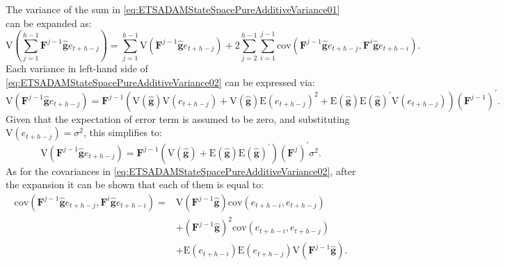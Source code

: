 \documentclass[
]{book}
\theoremstyle{definition}
\theoremstyle{definition}
\theoremstyle{definition}
\theoremstyle{definition}
\theoremstyle{remark}
\begin{document}
The variance of the sum in \eqref{eq:ETSADAMStateSpacePureAdditiveVariance01} can be expanded as:
\begin{equation}
    \mathrm{V} \left(\sum_{j=1}^{h-1} \mathbf{F}^{j-1} \hat{\mathbf{g}} e_{t+h-j} \right) = \sum_{j=1}^{h-1} \mathrm{V} \left(\mathbf{F}^{j-1} \hat{\mathbf{g}} e_{t+h-j}\right) + 2 \sum_{j=2}^{h-1} \sum_{i=1}^{j-1} \mathrm{cov}(\mathbf{F}^{j-1} \hat{\mathbf{g}} e_{t+h-j},\mathbf{F}^{i} \hat{\mathbf{g}} e_{t+h-i}).
  \label{eq:ETSADAMStateSpacePureAdditiveVariance02}
\end{equation}
Each variance in left-hand side of \eqref{eq:ETSADAMStateSpacePureAdditiveVariance02} can be expressed via:
\begin{equation}
    \mathrm{V} \left(\mathbf{F}^{j-1} \hat{\mathbf{g}} e_{t+h-j}\right) = \mathbf{F}^{j-1} \left( \mathrm{V} (\hat{\mathbf{g}}) \mathrm{V}(e_{t+h-j}) + \mathrm{V} (\hat{\mathbf{g}}) \mathrm{E}(e_{t+h-j})^2 + \mathrm{E} (\hat{\mathbf{g}}) \mathrm{E} (\hat{\mathbf{g}})^\prime \mathrm{V}(e_{t+h-j})\right) (\mathbf{F}^{j-1})^\prime.
  \label{eq:ETSADAMStateSpacePureAdditiveVariance03}
\end{equation}
Given that the expectation of error term is assumed to be zero, and substituting \(\mathrm{V}(e_{t+h-j})=\sigma^2\), this simplifies to:
\begin{equation}
    \mathrm{V} \left(\mathbf{F}^{j-1} \hat{\mathbf{g}} e_{t+h-j}\right) = \mathbf{F}^{j-1} \left( \mathrm{V} (\hat{\mathbf{g}}) + \mathrm{E} (\hat{\mathbf{g}}) \mathrm{E} (\hat{\mathbf{g}})^\prime \right) (\mathbf{F}^{j})^\prime \sigma^2.
  \label{eq:ETSADAMStateSpacePureAdditiveVariance04}
\end{equation}
As for the covariances in \eqref{eq:ETSADAMStateSpacePureAdditiveVariance02}, after the expansion it can be shown that each of them is equal to:
\begin{equation}
    \begin{aligned}
    \mathrm{cov}(\mathbf{F}^{j-1} \hat{\mathbf{g}} e_{t+h-j},\mathbf{F}^{i} \hat{\mathbf{g}} e_{t+h-i}) = & \mathrm{V}(\mathbf{F}^{j-1} \hat{\mathbf{g}}) \mathrm{cov}(e_{t+h-i},e_{t+h-j}) \\
     & + \left(\mathbf{F}^{j-1} \hat{\mathbf{g}}\right)^2 \mathrm{cov}(e_{t+h-i},e_{t+h-j}) \\
    & + \mathrm{E}(e_{t+h-i}) \mathrm{E}(e_{t+h-j}) \mathrm{V}(\mathbf{F}^{j-1} \hat{\mathbf{g}}).
    \end{aligned}
  \label{eq:ETSADAMStateSpacePureAdditiveVariance05}
\end{equation}
\end{document}

